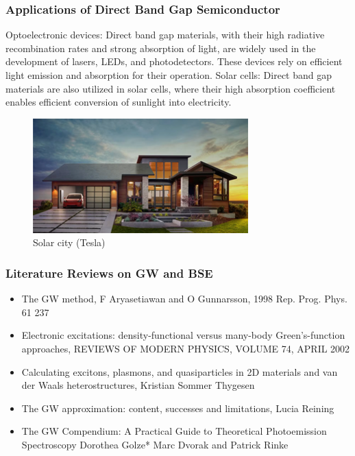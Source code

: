 \documentclass{CustomBeamer}
\begin{document}
            \begin{frame}
                \frametitle{Applications of Direct Band Gap Semiconductor}
                \begin{itemize}
    Optoelectronic devices: Direct band gap materials, with their high radiative recombination rates and strong absorption of light, are widely used in the development of lasers, LEDs, and photodetectors. These devices rely on efficient light emission and absorption for their operation.
    Solar cells: Direct band gap materials are also utilized in solar cells, where their high absorption coefficient enables efficient conversion of sunlight into electricity.
            \end{itemize}
            \begin{figure}
                \centering
                \includegraphics[width=0.4\linewidth]{solarcity.png}
                \caption{Solar city (Tesla)            }
            \end{figure}
            \end{frame}
  
            \begin{frame}
                    \frametitle{Literature Reviews on GW and BSE}
                    \begin{itemize}
                        \item The GW method, F Aryasetiawan and O Gunnarsson, 1998 Rep. Prog. Phys. 61 237 
                        \item Electronic excitations: density-functional versus many-body Green’s-function approaches, REVIEWS OF MODERN PHYSICS, VOLUME 74, APRIL 2002 
                        \item Calculating excitons, plasmons, and quasiparticles in 2D materials and van der Waals heterostructures, Kristian Sommer Thygesen
                        \item The GW approximation: content, successes and limitations, Lucia Reining
                        \item The GW Compendium: A Practical Guide to Theoretical Photoemission Spectroscopy
                        Dorothea Golze* Marc Dvorak and Patrick Rinke %
                    \end{itemize}
                    \end{frame}
            
                
\end{document}
